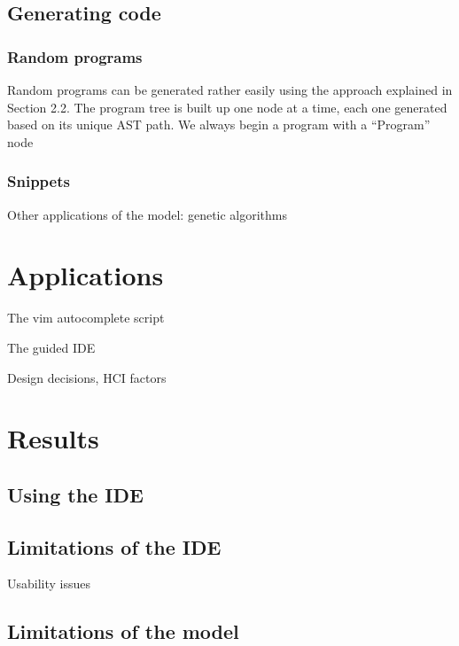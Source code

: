 \documentclass{article}
\begin{document}
\subsection{Generating code}

\subsubsection{Random programs}

Random programs can be generated rather easily using the approach explained in Section 2.2. The program tree is built up one node at a time, each one generated based on its unique AST path. We always begin a program with a ``Program'' node

\subsubsection{Snippets}



%

Other applications of the model: genetic algorithms

\section{Applications}

The vim autocomplete script

The guided IDE

Design decisions, HCI factors

\section{Results}

\subsection{Using the IDE}

\subsection{Limitations of the IDE}

Usability issues

\subsection{Limitations of the model}
\end{document}
